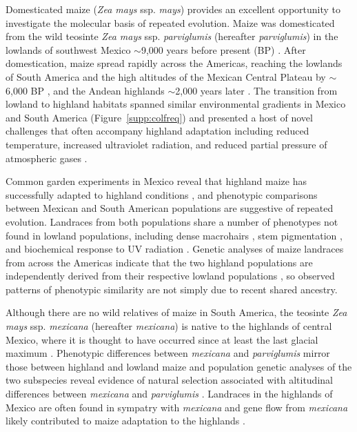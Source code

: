 Domesticated maize (\emph{Zea mays} ssp. \emph{mays}) provides an excellent opportunity to investigate the molecular basis of repeated evolution.  
Maize was domesticated from the wild teosinte \emph{Zea mays} ssp. \emph{parviglumis} (hereafter \emph{parviglumis}) in the lowlands of southwest Mexico $\sim$9,000 years before present (BP) \cite[]{Matsuoka_2002_11983901,Piperno_2009_19307570,vanHeerwaarden_2011_21189301}. 
After domestication, maize spread rapidly across the Americas, reaching the lowlands of South America and the high altitudes of the Mexican Central Plateau by $\sim$6,000 BP \cite[]{Piperno_2006_69}, and the Andean highlands $\sim$2,000 years later \cite[]{Perry_2006_16511492,Grobman_2012_22307642}. 
The transition from lowland to highland habitats spanned similar environmental gradients in Mexico and South America (Figure~\ref{supp:colfreq}) and presented a host of novel challenges that often accompany highland adaptation including reduced temperature, increased ultraviolet radiation, and reduced partial pressure of atmospheric gases \cite[]{Korner_2007_17988759}.

Common garden experiments in Mexico reveal that highland maize has successfully adapted to highland conditions \cite[]{Mercer2008}, and phenotypic comparisons between Mexican and South American populations are suggestive of repeated evolution.  
Landraces from both populations share a number of phenotypes not found in lowland populations, including dense macrohairs \cite[]{Wilkes_1977,Wellhausen1957:book}, stem pigmentation \cite[]{Wilkes_1977,Wellhausen1957:book}, and biochemical response to UV radiation \cite[]{Casati2005}. 
Genetic analyses of maize landraces from across the Americas indicate that the two highland populations are independently derived from their respective lowland populations \cite[]{Vigouroux_2008_21632329, vanHeerwaarden_2011_21189301}, so observed patterns of phenotypic similarity are not simply due to recent shared ancestry. 

Although there are no wild relatives of maize in South America, the teosinte \emph{Zea mays} ssp. \emph{mexicana} (hereafter \emph{mexicana}) is native to the highlands of central Mexico, where it is thought to have occurred since at least the last glacial maximum \cite[]{Ross-Ibarra_2009_19153259, Hufford_niche}. Phenotypic differences between \emph{mexicana} and \emph{parviglumis} mirror those between highland and lowland maize \cite[]{Lauter_2004_15342532} and population genetic analyses of the two subspecies reveal evidence of natural selection associated with altitudinal differences between \emph{mexicana} and \emph{parviglumis} \cite[]{Pyhajarvi2013}.  Landraces in the highlands of Mexico are often found in sympatry with  \emph{mexicana} and gene flow from \emph{mexicana} likely contributed to maize adaptation to the highlands \cite[]{Profford_2013}.

